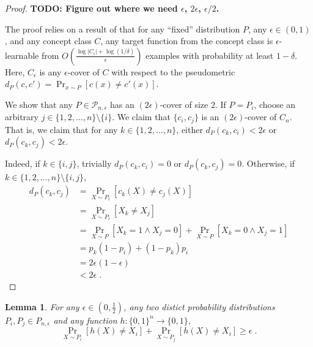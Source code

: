 \documentclass[12pt]{article}
\newtheorem{lemma}[proposition]{Lemma}
\renewcommand{\P}{\mathcal{P}}
\begin{document}
\begin{proof}
\textbf{TODO: Figure out where we need $\epsilon$, $2\epsilon$, $\epsilon/2$.}

The proof relies on a result of \cite{Benedek-Itai-1991} that for any ``fixed''
distribution $P$, any $\epsilon \in (0,1)$, and any concept class $C$, any
target function from the concept class is $\epsilon$-learnable from $O \left(
\frac{\log |C_\epsilon| + \log (1/\delta)}{\epsilon}\right)$ examples with
probability at least $1-\delta$. Here, $C_\epsilon$ is any $\epsilon$-cover of
$C$ with respect to the pseudometric $d_P(c,c') = \Pr_{x \sim P}[c(x) \neq
c'(x)]$.

We show that any $P \in \P_{n,\epsilon}$ has an $(2\epsilon)$-cover of size $2$.
If $P = P_i$, choose an arbitrary $j \in \{1,2,\dots,n\} \setminus \{i\}$. We
claim that $\{c_i, c_j\}$ is an $(2\epsilon)$-cover of $C_n$. That is, we claim
that for any $k \in \{1,2,\dots,n\}$, either $d_P(c_k,c_i) < 2\epsilon$ or
$d_P(c_k,c_j) < 2\epsilon$.

Indeed, if $k \in \{i,j\}$, trivially $d_P(c_k,c_i) = 0$ or $d_P(c_k,c_j) = 0$.
Otherwise, if  $k \in \{1,2,\dots,n\} \setminus \{i,j\}$,
\begin{align*}
d_P(c_k, c_j)
& = \Pr_{X \sim P_i}[c_k(X) \neq c_j(X)] \\
& = \Pr_{X \sim P_i}[X_k \neq X_j] \\
& = \Pr_{X \sim P}[X_k = 1 \wedge X_j = 0] + \Pr_{X \sim P}[X_k = 0 \wedge X_j = 1] \\
& = p_k(1 - p_i) + (1 - p_k) p_i \\
& = 2 \epsilon (1-\epsilon) \\
& < 2 \epsilon \; .
\end{align*}
\end{proof}

\begin{lemma}
\label{lemma:projection-distances}
For any $\epsilon \in (0,\frac{1}{2})$,
any two distict probability distributions $P_i,P_j \in P_{n,\epsilon}$
and any function $h:\{0,1\}^n \to \{0,1\}$,
$$
\Pr_{X \sim P_i}[h(X) \neq X_i] + \Pr_{X \sim P_j}[h(X) \neq X_i] \ge \epsilon \; .
$$
\end{lemma}
\end{document}
